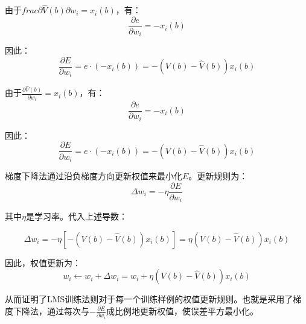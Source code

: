 \documentclass{article}
\begin{document}
    由于$frac{\partial \hat{V}(b)}{\partial w_i}=x_i(b)$，有：
    $$\frac{\partial e}{\partial w_i}=-x_i(b)$$

    因此：
    $$\frac{\partial E}{\partial w_i}=e\cdot(-x_i(b))=-\left(V(b)-\hat{V}(b)\right)x_i(b)$$

    由于$\frac{\partial \hat{V}(b)}{\partial w_i}=x_i(b)$，有：
    $$\frac{\partial e}{\partial w_i}=-x_i(b)$$

    因此：
    $$\frac{\partial E}{\partial w_i}=e\cdot(-x_i(b))=-\left(V(b)-\hat{V}(b)\right)x_i(b)$$

    梯度下降法通过沿负梯度方向更新权值来最小化$E$。更新规则为：
    $$\Delta w_i=-\eta \frac{\partial E}{\partial w_i}$$

    其中$\eta$是学习率。代入上述导数：

    $$\Delta w_i=-\eta \left[-\left(V(b)-\hat{V}(b)\right)x_i(b)\right]=\eta \left(V(b)-\hat{V}(b)\right)x_i(b)$$

    因此，权值更新为：
    $$w_i\leftarrow w_i+\Delta w_i=w_i+\eta \left(V(b)-\hat{V}(b)\right)x_i(b)$$

    从而证明了LMS训练法则对于每一个训练样例的权值更新规则。也就是采用了梯度下降法，通过每次与$-\frac{\partial E}{\partial w_i}$成比例地更新权值，使误差平方最小化。
\end{document}
